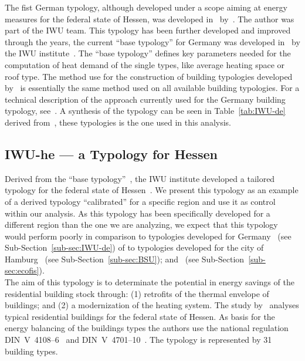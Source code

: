 The fist German typology, although developed under a scope aiming at energy
measures for the federal state of Hessen, was developed in~\citeyear{Ebel.1990}
by~\citeauthor{Ebel.1990}. The author was part of the IWU team.  This typology
has been further developed and improved through the years, the current ``base
typology'' for Germany was developed in~\citeyear{IWU.2003} by the IWU
institute~\cite{IWU.2003}.  The ``base typology'' defines key parameters
needed for the computation of heat demand of the single types, like average
heating space or roof type.  The method use for the construction of
building typologies developed by~\cite{Ebel.1990} is essentially the same
method used on all available building typologies.  For a technical description
of the approach currently used for the Germany building typology,
see~\cite{Loga.2012}.  A synthesis of the typology can be seen in
Table~\ref{tab:IWU-de} derived from~\cite{Loga.2011}, these typologies is the one
used in this analysis.\\



\subsection{IWU-he --- a Typology for Hessen}\label{sub-sec:IWU-he}

Derived from the ``base typology''~\cite{IWU.2003}, the IWU institute developed
a tailored typology for the federal state of
Hessen~\cite{Born.2003}.  We present this typology as an
example of a derived typology ``calibrated'' for a specific region and use it
as control within our analysis.  As this typology has been specifically
developed for a different region than the one we are analyzing, we expect that
this typology would perform poorly in comparison to typologies developed for
Germany~\cite{Loga.2012} (see Sub-Section~\ref{sub-sec:IWU-de}) of to
typologies developed for the city of Hamburg~\cite{BSU.2011} (see
Sub-Section~\ref{sub-sec:BSU}); and~\cite{Hermelink.2011} (see
Sub-Section~\ref{sub-sec:ecofis}).\\

The aim of this typology is to determinate the potential in energy savings of
the residential building stock through:
(1) retrofits of the thermal envelope of buildings; and
(2) a modernization of the heating system\cite{Born.2003}.
The study by~\citet{Born.2003} analyses typical
residential buildings for the federal state of Hessen.  As basis for
the energy balancing of the buildings types the authors use the national
regulation DIN~V~4108--6~\cite{DIN.4108-6} and
DIN~V~4701--10~\cite{DIN.4701-10}.  The typology is represented by 31
building types.\\

